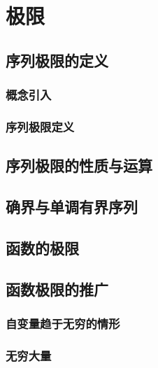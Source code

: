 

\chapter{极\emspace 限}\label{ch:2}
\section{序列极限的定义}
\subsection{概念引入}
\subsection{序列极限定义}
\begin{exercise}

\end{exercise}
\section{序列极限的性质与运算}
\begin{exercise}

\end{exercise}
\section{确界与单调有界序列}
\begin{exercise}

\end{exercise}
\section{函数的极限}
\begin{exercise}

\end{exercise}
\section{函数极限的推广}
\subsection{自变量趋于无穷的情形}
\subsection{无穷大量}
